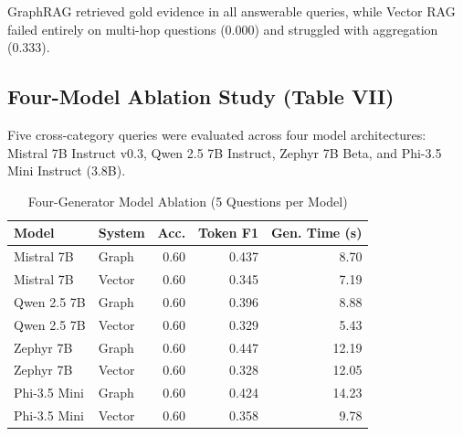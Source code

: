 \documentclass[conference]{IEEEtran}
\begin{document}
GraphRAG retrieved gold evidence in all answerable queries, while Vector RAG failed entirely on multi-hop questions (0.000) and struggled with aggregation (0.333).

\subsection{Four-Model Ablation Study (Table VII)}
Five cross-category queries were evaluated across four model architectures: Mistral 7B Instruct v0.3, Qwen 2.5 7B Instruct, Zephyr 7B Beta, and Phi-3.5 Mini Instruct (3.8B).

\begin{table}[htbp]
\caption{Four-Generator Model Ablation (5 Questions per Model)}
\label{tab:ablation}
\centering
\begin{tabularx}{\linewidth}{llrrr}
\toprule
\textbf{Model} & \textbf{System} & \textbf{Acc.} & \textbf{Token F1} & \textbf{Gen. Time (s)} \\
\midrule
Mistral 7B & Graph & 0.60 & 0.437 & 8.70 \\
Mistral 7B & Vector & 0.60 & 0.345 & 7.19 \\
Qwen 2.5 7B & Graph & 0.60 & 0.396 & 8.88 \\
Qwen 2.5 7B & Vector & 0.60 & 0.329 & 5.43 \\
Zephyr 7B & Graph & 0.60 & 0.447 & 12.19 \\
Zephyr 7B & Vector & 0.60 & 0.328 & 12.05 \\
Phi-3.5 Mini & Graph & 0.60 & 0.424 & 14.23 \\
Phi-3.5 Mini & Vector & 0.60 & 0.358 & 9.78 \\
\bottomrule
\end{tabularx}
\end{table}
\end{document}
